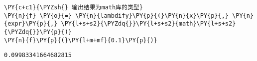     \begin{tcolorbox}[breakable, size=fbox, boxrule=1pt, pad at break*=1mm,colback=cellbackground, colframe=cellborder]
\begin{Verbatim}[commandchars=\\\{\}]
\PY{c+c1}{\PYZsh{} 输出结果为math库的类型}
\PY{n}{f} \PY{o}{=} \PY{n}{lambdify}\PY{p}{(}\PY{n}{x}\PY{p}{,} \PY{n}{expr}\PY{p}{,} \PY{l+s+s2}{\PYZdq{}}\PY{l+s+s2}{math}\PY{l+s+s2}{\PYZdq{}}\PY{p}{)}
\PY{n}{f}\PY{p}{(}\PY{l+m+mf}{0.1}\PY{p}{)}
\end{Verbatim}
\end{tcolorbox}

            \begin{tcolorbox}[breakable, size=fbox, boxrule=.5pt, pad at break*=1mm, opacityfill=0]
\begin{Verbatim}[commandchars=\\\{\}]
0.09983341664682815
\end{Verbatim}
\end{tcolorbox}
